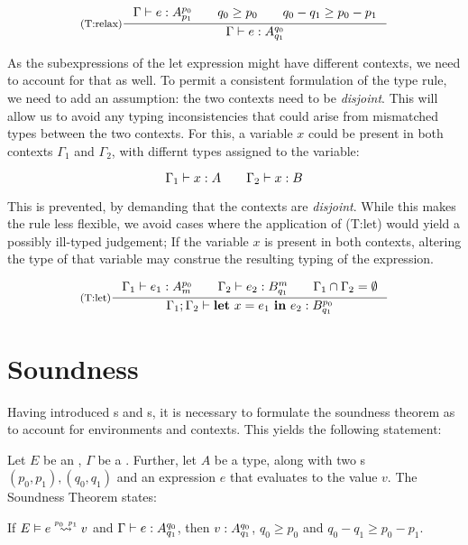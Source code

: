 \[
   \inference[(T:relax)]
   {\typing{\Gamma}{e}{\ratype{A}{p_0}{p_1}} \qquad q_0 \geq p_0 \qquad q_0 - q_1 \geq p_0 - p_1}
   {\typing{\Gamma}{e}{\ratype{A}{q_0}{q_1}}}
\]

As the subexpressions of the let expression might have different contexts, we need to account for that as well. To permit a consistent formulation of the type rule, we need to add an assumption: the two contexts need to be \emph{disjoint}. This will allow us to avoid any typing inconsistencies that could arise from mismatched types between the two contexts. 
For this, a variable \(x\) could be present in both contexts \(\Gamma_1\) and \(\Gamma_2\), with differnt types assigned to the variable:

\[
   \Gamma_1 \vdash x : A \qquad \Gamma_2 \vdash x : B
\]

This is prevented, by demanding that the contexts are \emph{disjoint}. While this makes the rule less flexible, we avoid cases where the application of (T:let) would yield a possibly ill-typed judgement; If the variable \(x\) is present in both contexts, altering the type of that variable may construe the resulting typing of the expression.

\[
   \inference[(T:let)]
   {\typing{\Gamma_1}{e_1}{\ratype{A}{p_0}{m}} \qquad \typing{\Gamma_2}{e_2}{\ratype{B}{m}{q_1}} \qquad \Gamma_1 \cap \Gamma_2 = \emptyset}
   {\typing{\Gamma_1; \Gamma_2}{\letexp{x}{e_1}{e_2}}{\ratype{B}{p_0}{q_1}}}
\]


\section{Soundness}

Having introduced s and s, it is necessary to formulate the soundness theorem as to account for environments and contexts. This yields the following statement:

\begin{theorem}\label{thm:soundness-5}
   Let \(E\) be an , \(\Gamma\) be a . Further, let \(A\) be a type, along with two s \((p_0, p_1), (q_0, q_1)\) and an expression \(e\) that evaluates to the value \(v\). The Soundness Theorem states:

   \begin{center}
   If \(\evals{E}{e}{v}{p_0}{p_1}\) and \(\Gamma \vdash e : A ^{q_0}_{q_1}\), then \(v : A ^{q_0}_{q_1}\), \(q_0 \geq p_0\) and \(q_0 - q_1 \geq p_0 - p_1\).
   \end{center}
\end{theorem}

